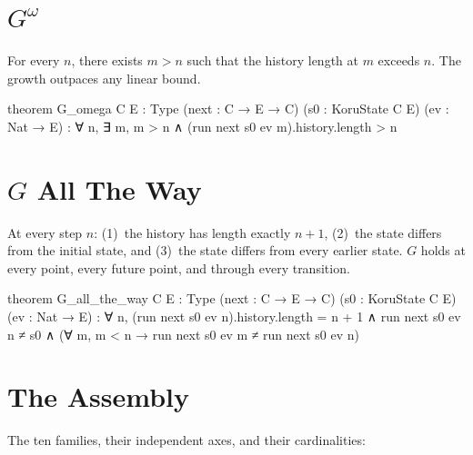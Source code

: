 \section{$G^\omega$}

\begin{theorem}\label{thm:omega}
For every $n$, there exists $m > n$ such that the history length at $m$ exceeds $n$. The growth outpaces any linear bound.
\end{theorem}

\begin{leancode}
theorem G_omega {C E : Type}
    (next : C → E → C) (s0 : KoruState C E)
    (ev : Nat → E) :
    ∀ n, ∃ m, m > n ∧
        (run next s0 ev m).history.length > n
\end{leancode}

\section{$G$ All The Way}

\begin{theorem}\label{thm:all-the-way}
At every step $n$: (1)~the history has length exactly $n + 1$, (2)~the state differs from the initial state, and (3)~the state differs from every earlier state. $G$ holds at every point, every future point, and through every transition.
\end{theorem}

\begin{leancode}
theorem G_all_the_way {C E : Type}
    (next : C → E → C) (s0 : KoruState C E)
    (ev : Nat → E) :
    ∀ n,
        (run next s0 ev n).history.length = n + 1 ∧
        run next s0 ev n ≠ s0 ∧
        (∀ m, m < n → run next s0 ev m ≠ run next s0 ev n)
\end{leancode}

\section{The Assembly}

The ten families, their independent axes, and their cardinalities:

